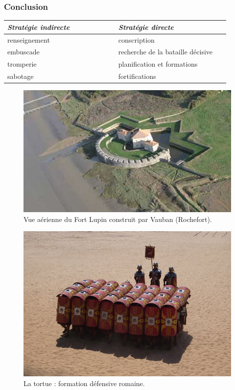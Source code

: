 \documentclass{article}
\begin{document}
\subsubsection{Conclusion}

\begin{tabular}{|p{0.45\linewidth}|p{0.45\linewidth}|}
\hline
\emph{Stratégie indirecte} & \emph{Stratégie directe}\\
\hline
renseignement & conscription\\
embuscade & recherche de la bataille décisive\\
tromperie & planification et formations\\
sabotage & fortifications\\
\hline
\end{tabular}

\begin{figure}[H]
	\begin{centering}
	\includegraphics[width=0.8\linewidth]{../ressources/Vauban_Fort_Lupin}
	\caption{Vue aérienne du Fort Lupin construit par Vauban (Rochefort). \cite{fort_lupin}}
	\end{centering}
\end{figure}
\begin{figure}[H]
	\begin{centering}
	\includegraphics[width=\linewidth]{../ressources/tortue}
	\caption{La tortue : formation défensive romaine. \cite{turtle_form}}
	\end{centering}
\end{figure}
\end{document}
